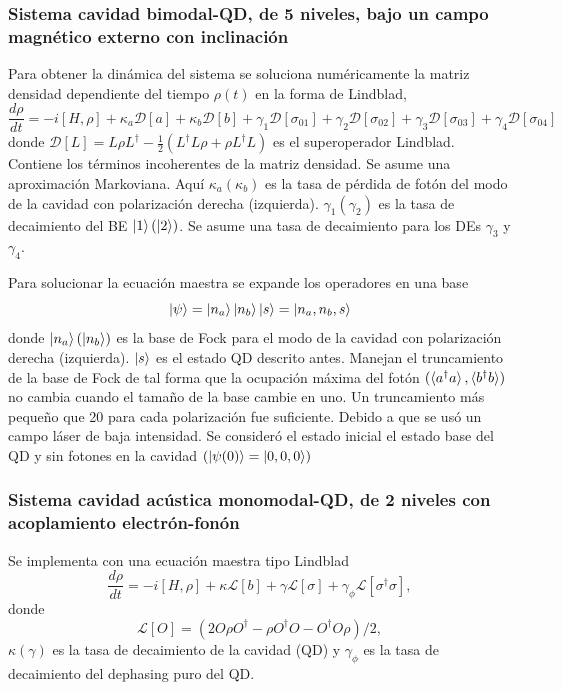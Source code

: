 \documentclass[../main.tex]{subfiles}
\begin{document}
\subsubsection{Sistema cavidad bimodal-QD, de 5 niveles, bajo un campo magnético externo con inclinación}
Para obtener la dinámica del sistema se soluciona numéricamente la matriz densidad dependiente del tiempo $\rho(t)$ en la forma de Lindblad,
\begin{equation}\label{eq:masterEquationMagnetic}
	\frac{d\rho}{dt} = -i [H,\rho] + \kappa_a \mathcal{D}[a] + \kappa_b \mathcal{D}[b] + \gamma_1 \mathcal{D}[\sigma_{01}] + \gamma_2 \mathcal{D}[\sigma_{02}] + \gamma_3 \mathcal{D}[\sigma_{03}] + \gamma_4 \mathcal{D}[\sigma_{04}]
\end{equation}
donde $\mathcal{D}[L] = L\rho L^\dagger - \tfrac{1}{2}(L^\dagger L \rho + \rho L^\dagger L)$ es el superoperador Lindblad. Contiene los términos incoherentes de la matriz densidad. Se asume una aproximación Markoviana. Aquí $\kappa_a(\kappa_b)$ es la tasa de pérdida de fotón del modo de la cavidad con polarización derecha (izquierda). $\gamma_1 (\gamma_2)$ es la tasa de decaimiento del BE $\ket{1} (\ket{2})$. Se asume una tasa de decaimiento para los DEs $\gamma_3$ y $\gamma_4$.

Para solucionar la ecuación maestra se expande los operadores en una base
\begin{equation}
	\ket{\psi} = \ket{n_a}\ket{n_b}\ket{s} = \ket{n_a, n_b, s}
\end{equation}
donde $\ket{n_a} (\ket{n_b})$ es la base de Fock para el modo de la cavidad con polarización derecha (izquierda). $\ket{s}$ es el estado QD descrito antes. Manejan el truncamiento de la base de Fock de tal forma que la ocupación máxima del fotón $(\braket{a^\dagger a}, \braket{b^\dagger b})$ no cambia cuando el tamaño de la base cambie en uno. Un truncamiento más pequeño que 20 para cada polarización fue suficiente. Debido a que se usó un campo láser de baja intensidad. Se consideró el estado inicial el estado base del QD y sin fotones en la cavidad $(\ket{\psi(0)} = \ket{0,0,0})$

\subsubsection{Sistema cavidad acústica monomodal-QD, de 2 niveles con acoplamiento electrón-fonón}
Se implementa con una ecuación maestra tipo Lindblad
\begin{equation}
	\frac{d\rho}{dt} = -i[H,\rho] + \kappa \mathcal{L}[b] + \gamma \mathcal{L}[\sigma] + \gamma_\phi \mathcal{L}[\sigma^\dagger \sigma],
\end{equation}
donde
\begin{equation}
	\mathcal{L}[O] = (2O\rho O^\dagger - \rho O^\dagger O - O^\dagger O \rho)/2,
\end{equation}
$\kappa (\gamma)$ es la tasa de decaimiento de la cavidad (QD) y $\gamma_\phi$ es la tasa de decaimiento del dephasing puro del QD.
\end{document}

